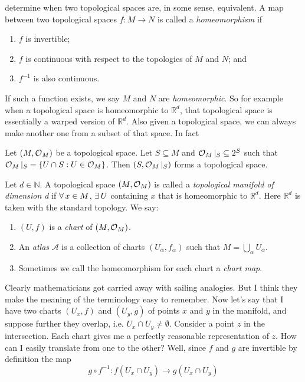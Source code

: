 determine when two topological spaces are, in some sense, equivalent.
A map between two topological spaces $f:M\to N$ is called a 
{\it homeomorphism} if
\begin{enumerate}
  \item $f$ is invertible;
  \item $f$ is continuous with respect to the topologies of $M$ and $N$; and
  \item $f^{-1}$ is also continuous.
\end{enumerate}
If such a function exists, we say $M$ and $N$ are {\it homeomorphic}.
So for example when a topological space is homeomorphic to
$\mathbb{R}^d$, that topological space is essentially a warped version
of $\mathbb{R}^d$. Also given a topological space, we can always make another
one from a subset of that space. In fact
\begin{proposition}{}{}
  Let $(M,\operatorname{\mathcal{O}}_{M})$ be a topological space. Let $S\subseteq M$ and
  $\operatorname{\mathcal{O}}_{M}|_S\subseteq 2^S$ such that 
  $\operatorname{\mathcal{O}}_{M}|_S=\{U\cap S:U\in\operatorname{\mathcal{O}}_{M}\}$. Then $(S,\operatorname{\mathcal{O}}_{M}|_S)$ forms
  a topological space.
\end{proposition}
Let $d\in\mathbb{N}$. A topological space $(M,\operatorname{\mathcal{O}}_{M})$ is called a
{\it topological manifold of dimension d} if $\operatorname{\forall} x\in M$, 
$\operatorname{\exists} U$ containing $x$ that is homeomorphic to $\mathbb{R}^d$. Here
$\mathbb{R}^d$ is taken with the standard topology. We say:
\begin{enumerate}
  \item $(U,f)$ is a {\it chart} of $(M,\operatorname{\mathcal{O}}_{M})$.
  \item An {\it atlas} $\mathcal{A}$ is a collection of charts
        $(U_\alpha,f_\alpha)$ such that $M=\bigcup_\alpha U_\alpha$.
  \item Sometimes we call the homeomorphism for each chart a
        {\it chart map}.
\end{enumerate}
Clearly mathematicians got carried away with sailing analogies. But I think
they make the meaning of the terminology easy to remember. Now let's say that
I have two charts $(U_x,f)$ and $(U_y,g)$ of points $x$ and $y$ in the
manifold, and suppose further they overlap, i.e. $U_x\cap U_y\neq\emptyset$.
Consider a point $z$ in the intersection. Each chart gives me a perfectly
reasonable representation of $z$. How can I easily translate from one to the
other? Well, since $f$ and $g$ are invertible by definition the map
$$g\circ f^{-1}:f(U_x\cap U_y)\to g(U_x\cap U_y)$$
